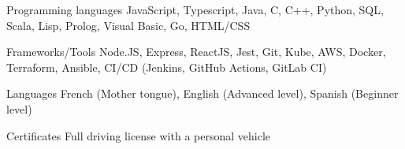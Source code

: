 
\begin{cvskills}
  \cvskill
    {Programming languages} %
    {JavaScript, Typescript, Java, C, C++, Python, SQL, Scala, Lisp, Prolog, Visual Basic, Go, HTML/CSS} %

  \cvskill
    {Frameworks/Tools} %
    {Node.JS, Express, ReactJS, Jest, Git, Kube, AWS, Docker, Terraform, Ansible, CI/CD (Jenkins, GitHub Actions, GitLab CI)} %
    
  \cvskill
    {Languages} %
    {French (Mother tongue), English (Advanced level), Spanish (Beginner level)} %
    
  \cvskill
    {Certificates} %
    {Full driving license with a personal vehicle} %
\end{cvskills}
